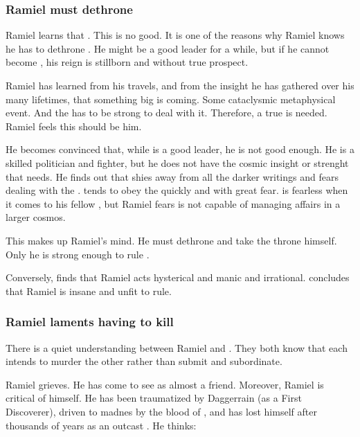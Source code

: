 \subsubsection{Ramiel must dethrone \Dasteron}
Ramiel learns that . 
This is no good. 
It is one of the reasons why Ramiel knows he has to dethrone \Dasteron. 
He might be a good leader for a while, but if he cannot become \apex{}, his reign is stillborn and without true prospect. 

Ramiel has learned from his travels, and from the insight he has gathered over his many lifetimes, that something big is coming. 
Some cataclysmic metaphysical event. 
And the \Mystraacht{} \matrix{} has to be strong to deal with it. 
Therefore, a true \apex{} is needed. 
Ramiel feels this \apex{} should be him. 

He becomes convinced that, while \Dasteron is a good leader, he is not good enough.
He is a skilled politician and fighter, but he does not have the cosmic insight or \vertex strenght that \Mystraacht needs.
He finds out that \Dasteron shies away from all the darker writings and fears dealing with the \banes.
\Dasteron tends to obey the \banes quickly and with great fear.
\Dasteron is fearless when it comes to his fellow \resphain, but Ramiel fears \Dasteron is not capable of managing \resphan affairs in a larger cosmos.

This makes up Ramiel's mind.
He must dethrone \Dasteron and take the throne himself.
Only he is strong enough to rule \Mystraacht. 

Conversely, \Dasteron finds that Ramiel acts hysterical and manic and irrational.
\Dasteron concludes that Ramiel is insane and unfit to rule. 





\subsubsection{Ramiel laments having to kill \Dasteron}
There is a quiet understanding between Ramiel and \Dasteron. 
They both know that each intends to murder the other rather than submit and subordinate. 

Ramiel grieves. 
He has come to see \Dasteron as almost a friend. 
Moreover, Ramiel is critical of himself. 
He has been traumatized by Daggerrain (as a First Discoverer), driven to madnes by the blood of \Nexagglachel, and has lost himself after thousands of years as an outcast \malach. 
He thinks:

